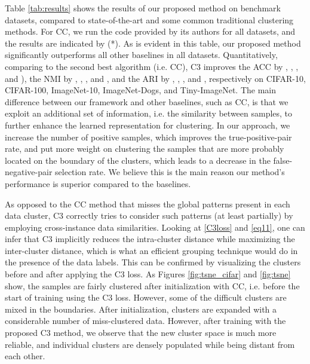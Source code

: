 \documentclass{bmvc2k}
\newcommand{\shadow}[1]{}
\def\s{\shadow}
\begin{document}
Table \ref{tab:results} shows the results of our proposed method on benchmark datasets, compared to state-of-the-art and some common traditional clustering methods. For CC, we run the code provided by its authors for all datasets, and the results are indicated by (*). As is evident in this table, our proposed method significantly outperforms all other baselines in all datasets. Quantitatively, comparing to the second best algorithm (i.e. CC), C3 improves the ACC by \s{ARE THE FOLLOWING NUMBERS UPDATED BASED ON THE CURRENT TABLE?? }, , ,  and ), the NMI by , , ,  and , and the ARI by , , ,  and , respectively on CIFAR-10, CIFAR-100, ImageNet-10, ImageNet-Dogs, and Tiny-ImageNet. The main difference between our framework and other baselines, such as CC, is that we exploit an additional set of information, i.e. the similarity between samples, to further enhance the learned representation for clustering. In our approach, we increase the number of positive samples, which improves the true-positive-pair rate, and put more weight on clustering the samples that are more probably located on the boundary of the clusters, which leads to a decrease in the false-negative-pair selection rate. We believe this is the main reason our method's performance is superior compared to the baselines.

As opposed to the CC method that misses the global patterns present in each data cluster, C3 correctly tries to consider such patterns (at least partially) by employing cross-instance data similarities.\s{and assigning lower weights to false negative samples and samples that are located far enough from each other in the z-space.}\s{ AND ****FILL***.} Looking at \eqref{C3loss} and \eqref{eq11}, one can infer that C3 implicitly reduces the intra-cluster distance while maximizing the inter-cluster distance, which is what an efficient grouping technique would do in the presence of the data labels. This can be confirmed by visualizing the clusters before and after applying the C3 loss. As Figures \ref{fig:tsne_cifar} and \ref{fig:tsne} show, the samples are fairly clustered after initialization with CC\s{at the end of the first step training using the CC loss,}, i.e. before the start of training using the C3 loss. However, some of the difficult clusters are mixed in the boundaries. After initialization, clusters \s{obtained by minimizing only the CC loss} are expanded with a considerable number of miss-clustered data. However, after training with the proposed C3 method, we observe that the new cluster space is much more reliable, and individual clusters are densely populated while being distant from each other.
\end{document}
